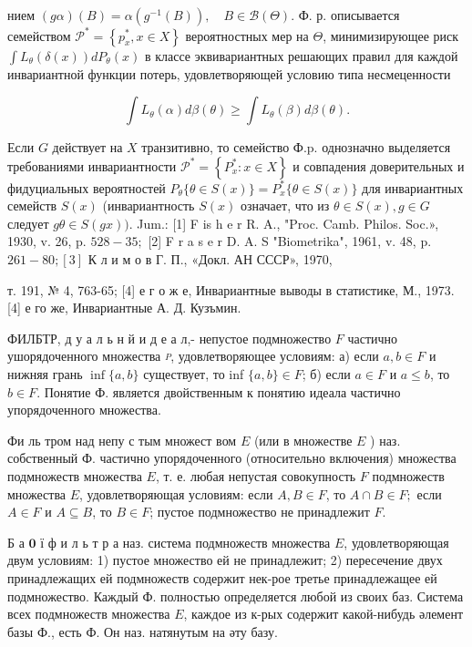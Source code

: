 \documentclass[10pt]{article}
\begin{document}
нием $(g \alpha)(B)=\alpha\left(g^{-1}(B)\right), \quad B \in \mathscr{B}(\Theta)$. Ф. р. описывается семейством $\mathscr{P}^{*}=\left\{p_{x}^{*}, x \in X\right\}$ вероятностных мер на $\Theta$, минимизирующее риск $\int L_{\theta}(\delta(x)) d P_{\theta}(x)$ в классе эквивариантных решающих правил для каждой инвариантной функции потерь, удовлетворяющей условию типа несмеценности



\[

\int L_{\theta}(\alpha) d \beta(\theta) \geqslant \int L_{\theta}(\beta) d \beta(\theta) .

\]



Если $G$ действует на $X$ транзитивно, то семейство Ф.p. однозначно выделяется требованиями инвариантности $\mathscr{P}^{*}=\left\{P_{x}^{*}: x \in X\right\}$ и совпадения доверительных и фидуциальных вероятностей $P_{\theta}\{\theta \in S(x)\}=P_{x}^{*}\{\theta \in S(x)\}$ для инвариантных семейств $S(x)$ (инвариантность $S(x)$ означает, что из $\theta \in S(x), g \in G$ следует $g \theta \in S(g x))$. Jum.: [1] F is h e r R. A., "Proc. Camb. Philos. Soc.», 1930, v. 26, p. $528-35 ;$ [2] F r a s e r D. A. S "Biometrika", 1961, v. 48, p. $261-80 ;[3]$ К л и м о в Г. П., «Докл. АН СССР», 1970,

т. 191, № 4, 763-65; [4] е г о ж е, Инвариантные выводы в статистике, М., 1973. [4] е го же, Инвариантные А. Д. Кузъмин.



ФИЛБТР, д у а л ь н й и д е а л,- непустое подмножество $F$ частично ушорядоченного множества $\stackrel{P}{ }$, удовлетворяющее условиям: а) если $a, b \in F$ и нижняя грань $\inf \{a, b\}$ существует, то inf $\{a, b\} \in F$; б) если $a \in F$ и $a \leqslant b$, то $b \in F$. Понятие Ф. является двойственным к понятию идеала частично упорядоченного множества.



Фи ль тром над непу с тым множест вом $E$ (или в множестве $E$ ) наз. собственный Ф. частично упорядоченного (относительно включения) множества подмножеств множества $E$, т. е. любая непустая совокупность $F$ подмножеств множества $E$, удовлетворяющая условиям: если $A, B \in F$, то $A \cap B \in F ;$ если $A \in F$ и $A \subseteq B$, то $B \in F$; пустое подмножество не принадлежит $F$.



Б а $\mathbf{0}$ ї ф и л ь т р а наз. система подмножеств множества $E$, удовлетворяющая двум условиям: 1) пустое множество ей не принадлежит; 2) пересечение двух принадлежащих ей подмножеств содержит нек-рое третье принадлежащее ей подмножество. Каждый Ф. полностью определяется любой из своих баз. Система всех подмножеств множества $E$, каждое из к-рых содержит какой-нибудь әлемент базы Ф., есть Ф. Он наз. натянутым на әту базу.
\end{document}
